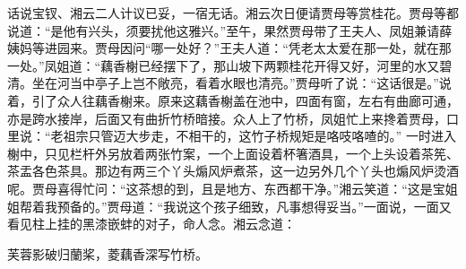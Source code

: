 \documentclass[12pt,oneside]{book}
\begin{document}
话说宝钗、湘云二人计议已妥，一宿无话。湘云次日便请贾母等赏桂花。贾母等都说道：“是他有兴头，须要扰他这雅兴。”至午，果然贾母带了王夫人、凤姐兼请薛姨妈等进园来。贾母因问“哪一处好？”王夫人道：“凭老太太爱在那一处，就在那一处。”凤姐道：“藕香榭已经摆下了，那山坡下两颗桂花开得又好，河里的水又碧清。坐在河当中亭子上岂不敞亮，看着水眼也清亮。”贾母听了说：“这话很是。”说着，引了众人往藕香榭来。原来这藕香榭盖在池中，四面有窗，左右有曲廊可通，亦是跨水接岸，后面又有曲折竹桥暗接。众人上了竹桥，凤姐忙上来搀着贾母，口里说：“老祖宗只管迈大步走，不相干的，这竹子桥规矩是咯吱咯喳的。”
一时进入榭中，只见栏杆外另放着两张竹案，一个上面设着杯箸酒具，一个上头设着茶筅、茶盂各色茶具。那边有两三个丫头煽风炉煮茶，这一边另外几个丫头也煽风炉烫酒呢。贾母喜得忙问：“这茶想的到，且是地方、东西都干净。”湘云笑道：“这是宝姐姐帮着我预备的。”贾母道：“我说这个孩子细致，凡事想得妥当。”一面说，一面又看见柱上挂的黑漆嵌蚌的对子，命人念。湘云念道：

芙蓉影破归蘭桨，菱藕香深写竹桥。
\end{document}
